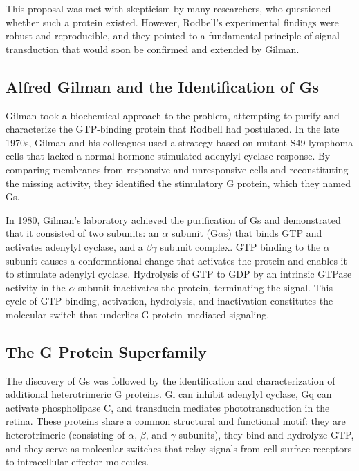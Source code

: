 This proposal was met with skepticism by many researchers, who questioned whether such a protein existed. However, Rodbell's experimental findings were robust and reproducible, and they pointed to a fundamental principle of signal transduction that would soon be confirmed and extended by Gilman.

\subsection{Alfred Gilman and the Identification of Gs}

Gilman took a biochemical approach to the problem, attempting to purify and characterize the GTP-binding protein that Rodbell had postulated. In the late 1970s, Gilman and his colleagues used a strategy based on mutant S49 lymphoma cells that lacked a normal hormone-stimulated adenylyl cyclase response. By comparing membranes from responsive and unresponsive cells and reconstituting the missing activity, they identified the stimulatory G protein, which they named Gs.

In 1980, Gilman's laboratory achieved the purification of Gs and demonstrated that it consisted of two subunits: an $\alpha$ subunit (G$\alpha$s) that binds GTP and activates adenylyl cyclase, and a $\beta\gamma$ subunit complex. GTP binding to the $\alpha$ subunit causes a conformational change that activates the protein and enables it to stimulate adenylyl cyclase. Hydrolysis of GTP to GDP by an intrinsic GTPase activity in the $\alpha$ subunit inactivates the protein, terminating the signal. This cycle of GTP binding, activation, hydrolysis, and inactivation constitutes the molecular switch that underlies G protein--mediated signaling.

\subsection{The G Protein Superfamily}

The discovery of Gs was followed by the identification and characterization of additional heterotrimeric G proteins. Gi can inhibit adenylyl cyclase, Gq can activate phospholipase C, and transducin mediates phototransduction in the retina. These proteins share a common structural and functional motif: they are heterotrimeric (consisting of $\alpha$, $\beta$, and $\gamma$ subunits), they bind and hydrolyze GTP, and they serve as molecular switches that relay signals from cell-surface receptors to intracellular effector molecules.

